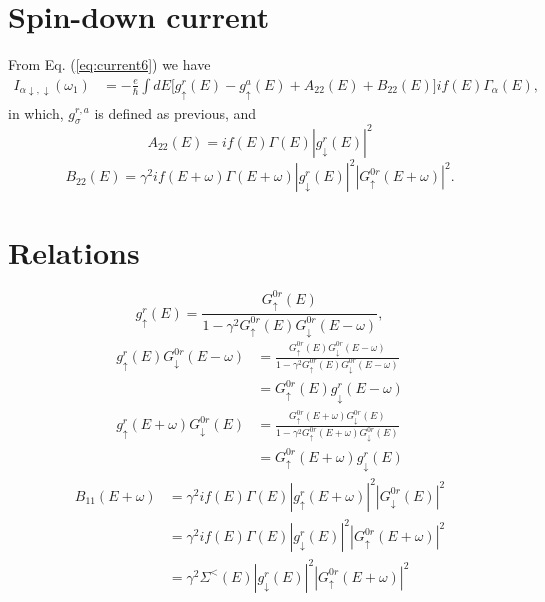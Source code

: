\documentclass[11pt,a4paper]{article}
\begin{document}
\section{Spin-down current}
From Eq. (\ref{eq:current6}) we have
\begin{equation}
\begin{split}
I_{\alpha\downarrow,\downarrow}(\omega_{1})&=-\frac{e}{\hbar}\int dE \big[g_{\uparrow}^{r}(E) - g_{\uparrow}^{a}\left(E\right) + A_{22}(E)+B_{22}(E) \big] if(E)\Gamma_{\alpha}(E) ,
\end{split}
\label{eq:current7}
\end{equation}
in which, $g_{\sigma}^{r,a}$ is defined as previous, and
\begin{equation}
A_{22}(E)= i f(E) \Gamma(E) |g_{\downarrow}^{r}\left(E\right)|^{2}
\end{equation}
\begin{equation}
B_{22}(E) = \gamma^{2} i f(E+\omega) \Gamma(E+\omega) |g_{\downarrow}^{r}\left(E\right)|^{2} |G_{\uparrow}^{0r}\left(E+\omega\right)|^{2} .
\end{equation}
\section{Relations}
\begin{equation}
g_{\uparrow}^{r}(E) = \frac{ G_{\uparrow}^{0r}(E)} {1-\gamma^{2} G_{\uparrow}^{0r}(E) G_{\downarrow}^{0r}(E-\omega)},
\end{equation}
\begin{equation}
\begin{split}
g_{\uparrow}^{r}(E) G_{\downarrow}^{0r}(E-\omega) &= \frac{ G_{\uparrow}^{0r}(E) G_{\downarrow}^{0r}(E-\omega)} {1-\gamma^{2} G_{\uparrow}^{0r}(E) G_{\downarrow}^{0r}(E-\omega)} \\
&= G_{\uparrow}^{0r}(E) g_{\downarrow}^{r}(E-\omega)
\end{split}
\end{equation}
\begin{equation}
\begin{split}
g_{\uparrow}^{r}(E+\omega) G_{\downarrow}^{0r}(E) &= \frac{ G_{\uparrow}^{0r}(E+\omega)G_{\downarrow}^{0r}(E)} {1-\gamma^{2} G_{\uparrow}^{0r}(E+\omega) G_{\downarrow}^{0r}(E)} \\
&= G_{\uparrow}^{0r}(E+\omega) g_{\downarrow}^{r}(E)
\end{split}
\end{equation}
\begin{equation}
\begin{split}
B_{11}(E+\omega) &= \gamma^{2} i f(E) \Gamma(E) |g_{\uparrow}^{r}\left(E+\omega\right)|^{2} |G_{\downarrow}^{0r}\left(E\right)|^{2} \\
&= \gamma^{2} i f(E) \Gamma(E)\left|g_{\downarrow}^{r}(E)\right|^{2}\left|G_{\uparrow}^{0 r}(E+\omega)\right|^{2} \\
&= \gamma^{2}\Sigma^{<}(E) \left|g_{\downarrow}^{r}(E)\right|^{2}\left|G_{\uparrow}^{0 r}(E+\omega)\right|^{2}
\end{split}
\end{equation}
\end{document}
